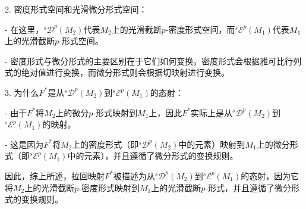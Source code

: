 \documentclass[lang=cn,zihao=-4,a4paper,fontset=none]{beautybook}
\begin{document}
2. 密度形式空间和光滑微分形式空间：

   - 在这里，$^s\mathscr{D}^p(M_2)$代表$M_2$上的光滑截断$p$-密度形式空间，而$^s\mathscr{E}^p(M_1)$代表$M_1$上的光滑截断$p$-形式空间。

   - 密度形式与微分形式的主要区别在于它们如何变换。密度形式会根据雅可比行列式的绝对值进行变换，而微分形式则会根据切映射进行变换。

3. 为什么$F^*$是从$^s\mathscr{D}^p(M_2)$到$^s\mathscr{E}^p(M_1)$的态射：

   - 由于$F^*$将$M_2$上的微分$p$-形式映射到$M_1$上，因此$F^*$实际上是从$^s\mathscr{D}^p(M_2)$到$^s\mathscr{E}^p(M_1)$的映射。

   - 这是因为$F^*$将$M_2$上的密度形式（即$^s\mathscr{D}^p(M_2)$中的元素）映射到$M_1$上的微分形式（即$^s\mathscr{E}^p(M_1)$中的元素），并且遵循了微分形式的变换规则。

因此，综上所述，拉回映射$F^*$被描述为从$^s\mathscr{D}^p(M_2)$到$^s\mathscr{E}^p(M_1)$的态射，因为它将$M_2$上的光滑截断$p$-密度形式映射到$M_1$上的光滑截断$p$-形式，并且遵循了微分形式的变换规则。
\end{document}
